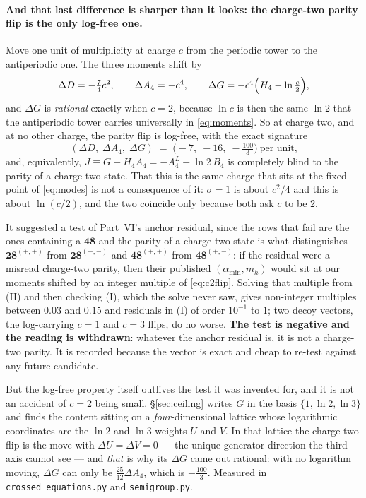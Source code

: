\documentclass[11pt,a4paper]{article}
\newcommand{\rep}[1]{\mathbf{#1}}
\newcommand{\amin}{\alpha_{\min}}
\begin{document}
\paragraph{And that last difference is sharper than it looks: the charge-two parity flip is
the only log-free one.} Move one unit of
multiplicity at charge $c$ from the periodic tower to the antiperiodic one. The three moments shift
by
\[
  \Delta D=-\tfrac74c^2,\qquad \Delta A_4=-c^4,\qquad
  \Delta G=-c^4\Bigl(H_4-\ln\tfrac{c}{2}\Bigr),
\]
and $\Delta G$ is \emph{rational} exactly when $c=2$, because $\ln c$ is then the same $\ln2$ that
the antiperiodic tower carries universally in \eqref{eq:moments}. So at charge two, and at no other
charge, the parity flip is log-free, with the exact signature
\begin{equation}\label{eq:c2flip}
  (\Delta D,\;\Delta A_4,\;\Delta G)\;=\;\bigl(-7,\;-16,\;-\tfrac{100}{3}\bigr)\ \text{per unit,}
\end{equation}
and, equivalently, $J\equiv G-H_4A_4=-A_4^{L}-\ln2\,B_4$ is completely blind to the parity of a
charge-two state. That this is the same charge that sits at the fixed point of \eqref{eq:modes} is
not a consequence of it: $\sigma=1$ is about $c^2/4$ and this is about $\ln(c/2)$, and the two
coincide only because both ask $c$ to be $2$.

It suggested a test of Part~VI's anchor residual, since the rows that fail are the ones containing a
$\rep{48}$ and the parity of a charge-two state is what distinguishes $\rep{28}^{(+,+)}$ from
$\rep{28}^{(+,-)}$ and $\rep{48}^{(+,+)}$ from $\rep{48}^{(+,-)}$: if the residual were a misread
charge-two parity, then their published $(\amin,m_h)$ would sit at our moments shifted by an
integer multiple of \eqref{eq:c2flip}. Solving that multiple from (II) and then checking (I), which
the solve never saw, gives non-integer multiples between $0.03$ and $0.15$ and residuals in (I) of
order $10^{-1}$ to $1$; two decoy vectors, the log-carrying $c=1$ and $c=3$ flips, do no worse.
\textbf{The test is negative and the reading is withdrawn}: whatever the anchor residual is, it is
not a charge-two parity. It is recorded because the vector is exact and cheap to re-test against any
future candidate.

But the log-free property itself outlives the test it was invented for, and it is not an accident
of $c=2$ being small. \S\ref{sec:ceiling} writes $G$ in the basis $\{1,\ln2,\ln3\}$ and finds the
content sitting on a \emph{four}-dimensional lattice whose logarithmic coordinates are the $\ln2$
and $\ln3$ weights $U$ and $V$. In that lattice the charge-two flip is the move with $\Delta U=\Delta V=0$ --- the
unique generator direction the third axis cannot see --- and \emph{that} is why its $\Delta G$ came
out rational: with no logarithm moving, $\Delta G$ can only be $\tfrac{25}{12}\Delta A_4$, which is
$-\tfrac{100}{3}$. Measured in \texttt{crossed\_\allowbreak equations.py} and
\texttt{semigroup.py}.
\end{document}
